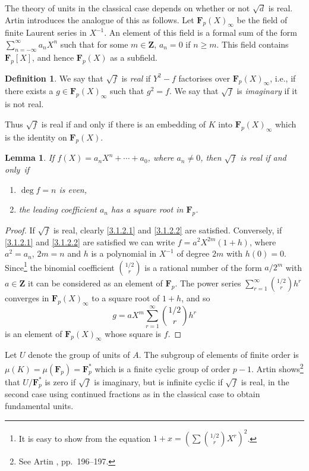 \documentclass[10pt]{article}
\newtheorem{lemm}[theo]{Lemma}
\theoremstyle{definition}
\newtheorem{defi}[theo]{Definition}
\def\ZZ{\mathbf{Z}}
\def\FF{\mathbf{F}}
\def\fntwtw{It is easy to show from the equation $1 + x = (\sum \binom{1/2}{r} X^r)^2$.}
\def\fntwth{See Artin \cite{bib:6}, pp.~196--197.}
\begin{document}
The theory of units in the classical case depends on whether or not $\sqrt d$ is real.
Artin introduces the analogue of this as follows.
Let $\FF_p(X)_\infty$ be the field of finite Laurent series in $X^{-1}$.
An element of this field is a formal sum of the form $\sum_{n=-\infty}^{\infty} a_n X^n$ such that for some $m \in \ZZ$, $a_n = 0$ if $n \geq m$.
This field contains $\FF_p[X]$, and hence $\FF_p(X)$ as a subfield.


\begin{defi}
\label{3.1.1}
We say that $\sqrt f$ is \emph{real} if $Y^2 - f$ factorises over $\FF_p(X)_\infty$, i.e., if there exists a $g \in \FF_p(X)_\infty$ such that $g^2 = f$.
We say that $\sqrt f$ is \emph{imaginary} if it is not real.
\end{defi}

Thus $\sqrt f$ is real if and only if there is an embedding of $K$ into $\FF_p(X)_\infty$ which is the identity on $\FF_p(X)$.

\begin{lemm}
\label{3.1.2}
If $f(X) = a_n X^n + \cdots + a_0$, where $a_n \not= 0$, then $\sqrt f$ is real if and only~if%
\begin{enumerate}
\item
\label{3.1.2.1}
$\deg f = n$ is even,

\item
\label{3.1.2.2}
the leading coefficient $a_n$ has a square root in $\FF_p$.
\end{enumerate}
\end{lemm}

\begin{proof}
If $\sqrt f$ is real, clearly \eqref{3.1.2.1} and \eqref{3.1.2.2} are satisfied.
Conversely, if \eqref{3.1.2.1} and \eqref{3.1.2.2} are satisfied we can write $f = a^2 X^{2m}(1 + h)$, where $a^2 = a_n$, $2m = n$ and $h$ is a polynomial in $X^{-1}$ of degree $2m$ with $h(0) = 0$.
Since\footnote{\fntwtw} the binomial coefficient $\binom{1/2}{r}$ is a rational number of the form $a/2^m$ with $a\in\ZZ$ it can be considered as an element of $\FF_p$.
The power series $\sum_{r=1}^\infty \binom{1/2}{r} h^r$ converges in $\FF_p(X)_\infty$ to a square root of $1+h$, and so
\[
g = aX^m \sum_{r=1}^\infty \binom{1/2}{r} h^r
\]
is an element of $\FF_p(X)_\infty$ whose square is $f$.
\end{proof}

Let $U$ denote the group of units of $A$.
The subgroup of elements of finite order is $\mu(K) = \mu(\FF_p) = \FF_p^*$ which is a finite cyclic group of order $p-1$.
Artin shows\footnote{\fntwth} that $U / \FF_p^*$ is zero if $\sqrt f$ is imaginary, but is infinite cyclic if $\sqrt f$ is real, in the second case using continued fractions as in the classical case to obtain fundamental units.
\end{document}
